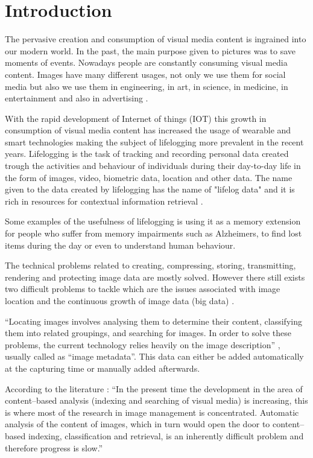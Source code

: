 \cleardoublepage

\chapter{Introduction}
\label{ch:introduction}


The pervasive creation and consumption of visual media content is ingrained into our modern world. In the past, the main purpose given to pictures was to save moments of events. Nowadays people are constantly consuming visual media content. Images have many different usages, not only we use them for social media but also we use them in engineering, in art, in science, in medicine, in entertainment and also in advertising \cite{Zhang2008}.



With the rapid development of Internet of things (IOT) this growth in consumption of visual media content has increased the usage of wearable and smart technologies making the subject of lifelogging more prevalent in the recent years. Lifelogging is the task of tracking and recording personal data created trough the activities and behaviour of individuals during their day-to-day life in the form of images, video, biometric data, location and other data. The name given to the data created by lifelogging has the name of "lifelog data" and it is rich in resources for contextual information retrieval \cite{Ribeiro}.

Some examples of the usefulness of lifelogging is using it as a memory extension for people who suffer from memory impairments such as Alzheimers, to find lost items during the day or even to understand human behaviour.


The technical problems related to creating, compressing, storing, transmitting, rendering and protecting image data are mostly solved. However there still exists two difficult problems to tackle which are the issues associated with image location and the continuous growth of image data (big data) \cite{Zhang2008}.

``Locating images involves analysing them to determine their content, classifying them into related groupings, and searching for  images. In order to solve these problems, the current technology relies heavily on the image description'' \cite{Zhang2008}, usually called as ``image metadata''. This data can either be added automatically at the capturing time or manually added afterwards.

According to the literature \cite{Zhang2008}: ``In the present time the development in the area of content–based analysis (indexing and searching of visual media) is increasing, this is where most of the research in image management is concentrated. Automatic analysis of the content of images, which in turn would open the door to content–based indexing, classification and retrieval, is an inherently difficult problem and therefore progress is slow.''


